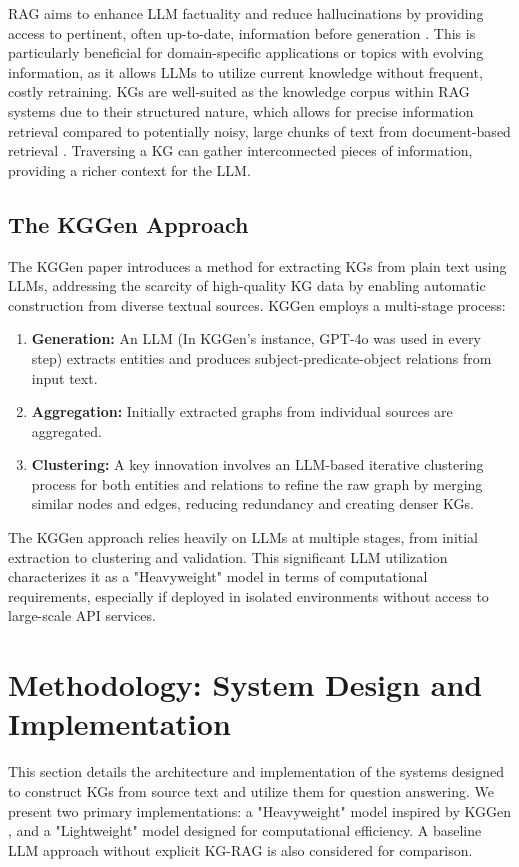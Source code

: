 \documentclass{article}
\begin{document}
RAG aims to enhance LLM factuality and reduce hallucinations by providing access to pertinent, often up-to-date, information before generation \citep{gao2023retrieval}. This is particularly beneficial for domain-specific applications or topics with evolving information, as it allows LLMs to utilize current knowledge without frequent, costly retraining. KGs are well-suited as the knowledge corpus within RAG systems due to their structured nature, which allows for precise information retrieval compared to potentially noisy, large chunks of text from document-based retrieval \citep{pan2023unifying}. Traversing a KG can gather interconnected pieces of information, providing a richer context for the LLM.

\subsection{The KGGen Approach}
The KGGen paper \citep{KGGen_Arxiv_2025} introduces a method for extracting KGs from plain text using LLMs, addressing the scarcity of high-quality KG data by enabling automatic construction from diverse textual sources. KGGen employs a multi-stage process:
\begin{enumerate}[noitemsep,topsep=0pt]
    \item \textbf{Generation:} An LLM (In KGGen's instance, GPT-4o was used in every step) extracts entities and produces subject-predicate-object relations from input text.
    \item \textbf{Aggregation:} Initially extracted graphs from individual sources are aggregated.
    \item \textbf{Clustering:} A key innovation involves an LLM-based iterative clustering process for both entities and relations to refine the raw graph by merging similar nodes and edges, reducing redundancy and creating denser KGs.

\end{enumerate}
The KGGen approach relies heavily on LLMs at multiple stages, from initial extraction to clustering and validation. This significant LLM utilization characterizes it as a "Heavyweight" model in terms of computational requirements, especially if deployed in isolated environments without access to large-scale API services.

\section{Methodology: System Design and Implementation}
\label{sec:methodology}
This section details the architecture and implementation of the systems designed to construct KGs from source text and utilize them for question answering. We present two primary implementations: a "Heavyweight" model inspired by KGGen \citep{KGGen_Arxiv_2025}, and a "Lightweight" model designed for computational efficiency. A baseline LLM approach without explicit KG-RAG is also considered for comparison.
\end{document}
